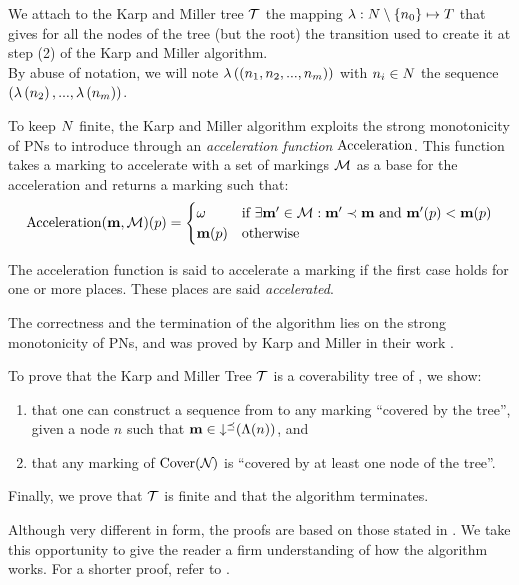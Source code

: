 We attach to the Karp and Miller tree $\mathcal{T}$ the mapping $\operatorname{\lambda} : N \setminus \{n_0\} \mapsto T$ that gives for all the nodes of the tree (but the root) the transition used to create it at step (2) of the Karp and Miller algorithm.\\
By abuse of notation, we will note
$\operatorname{\lambda}\left({(n_1, n_2, ..., n_m)}\right)$
with $n_i \in N$
the sequence
\\
$(\operatorname{\lambda}\left({n_2}\right), ..., \operatorname{\lambda}\left({n_m}\right))$.

To keep $N$ finite, the Karp and Miller algorithm exploits the strong monotonicity of \acp{PN} to introduce \omarks through an \emph{acceleration function} $\operatorname{Acceleration}$.
This function takes a marking \mar to accelerate with a set of markings $\mathcal{M}$ as a base for the acceleration and returns a marking such that:
\[
  \operatorname{Acceleration}(\mathbf{m},\mathcal{M})(p) =
  \begin{cases}
    \omega  &\text{if } \exists \mathbf{m}' \in \mathcal{M} : \mathbf{m}' \prec \mathbf{m} \text{ and } \mathbf{m}'(p) < \mathbf{m}(p) \\
    \mathbf{m}(p) &\text{otherwise}
  \end{cases}
\]

The acceleration function is said to accelerate a marking if the first case holds for one or more places.
These places are said \emph{accelerated}.

The correctness and the termination of the algorithm lies on the strong monotonicity of \acp{PN}, and was proved by Karp and Miller in their work \cite{Karp69}.

To prove that the Karp and Miller Tree $\mathcal{T}$ is a coverability tree of \namePN, we show:
\begin{enumerate}
  \item that one can construct a sequence from \mari to any marking \mar “covered by the tree”, given a node $n$ such that $\mathbf{m} \in \operatorname{\downarrow^\preceq}(\operatorname{\Lambda}(n))$, and
  \item that any marking of $\operatorname{Cover}(\mathcal{N}_{})$ is “covered by at least one node of the tree”.
\end{enumerate}

Finally, we prove that $\mathcal{T}$ is finite and that the algorithm terminates.

Although very different in form, the proofs are based on those stated in \cite{Karp69}.
We take this opportunity to give the reader a firm understanding of how the algorithm works.
For a shorter proof, refer to \cite{Karp69}.

